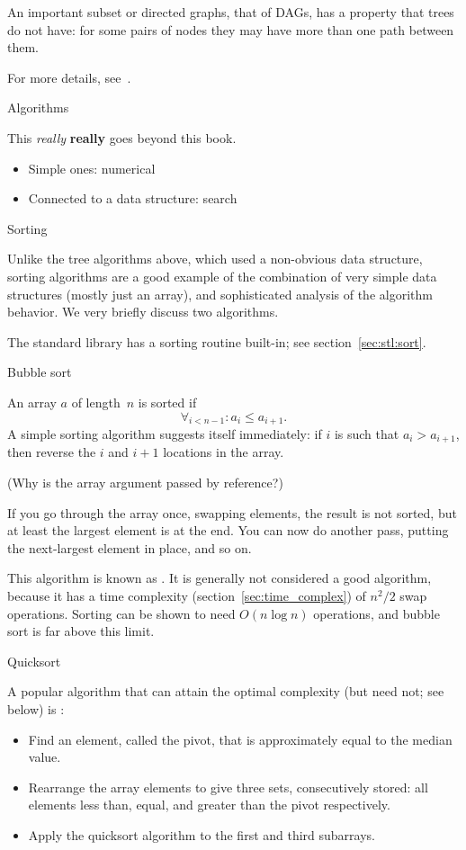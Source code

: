 An important subset or directed graphs, that of \acp{DAG},
has a property that trees do not have:
for some pairs of nodes they may have more than one
path between them.

For more details, see~.

 {Algorithms}

This \emph{really} \textbf{really} goes beyond this book.

\begin{itemize}
\item Simple ones: numerical
\item Connected to a data structure: search
\end{itemize}

 {Sorting}

Unlike the tree algorithms above, which used a non-obvious data
structure,
sorting algorithms are a good example of the combination of very
simple data structures (mostly just an array), and sophisticated
analysis of the algorithm behavior. We very briefly discuss two
algorithms.

The standard library has a sorting routine built-in;
see section~\ref{sec:stl:sort}.

 {Bubble sort}

An array $a$ of length~$n$ is sorted if
\[ \forall_{i<n-1}\colon a_i\leq a_{i+1}. \]
A simple sorting algorithm suggests itself immediately: if $i$ is such
that $a_i>a_{i+1}$, then reverse the $i$ and $i+1$ locations in the
array.


(Why is the array argument passed by reference?)

If you go through the array once, swapping elements, the result is not
sorted, but at least the largest element is at the end. You can now do
another pass, putting the next-largest element in place, and so on.

This algorithm is known as . It is generally
not considered a good algorithm, because it has a time complexity
(section~\ref{sec:time_complex}) of $n^2/2$ swap operations. Sorting
can be shown to need $O(n\log n)$ operations, and bubble sort is far
above this limit.

 {Quicksort}

A popular algorithm that can attain the optimal complexity (but need
not; see below) is :
\begin{itemize}
\item Find an element, called the pivot, that is approximately equal
  to the median value.
\item Rearrange the array elements to give three sets, consecutively
  stored: all elements less than, equal, and greater than the pivot
  respectively.
\item Apply the quicksort algorithm to the first and third subarrays.
\end{itemize}

